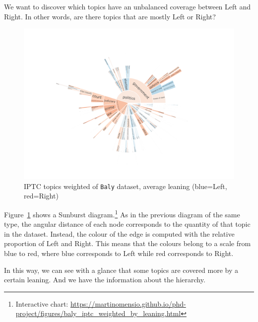 We want to discover which topics have an unbalanced coverage between Left and Right. In other words, are there topics that are mostly Left or Right?


\begin{figure}[!htbp]
    \centering
    \includegraphics[trim={2.2cm 2cm 2.2cm 2cm},clip,width=\linewidth]{figures/baly_iptc_weighted_by_leaning.pdf}
    \caption{IPTC topics weighted of \texttt{Baly} dataset, average leaning (blue=Left, red=Right)}
    \label{fig:baly_iptc_weighted_by_leaning}
\end{figure}

Figure~\ref{fig:baly_iptc_weighted_by_leaning} shows a Sunburst diagram.\footnote{Interactive chart: \url{https://martinomensio.github.io/phd-project/figures/baly_iptc_weighted_by_leaning.html}}
As in the previous diagram of the same type, the angular distance of each node corresponds to the quantity of that topic in the dataset.
Instead, the colour of the edge is computed with the relative proportion of Left and Right. This means that the colours belong to a scale from blue to red, where blue corresponds to Left while red corresponds to Right.

In this way, we can see with a glance that some topics are covered more by a certain leaning. And we have the information about the hierarchy.


